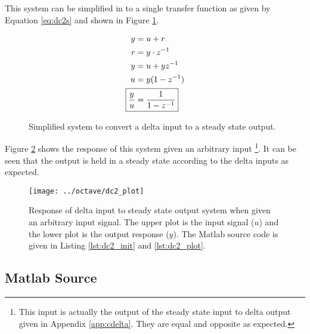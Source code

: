 \documentclass{article}
\begin{document}
This system can be simplified in to a single transfer function
as given by Equation \ref{eq:dc2s} and shown in Figure \ref{fig:dc1s}.

\begin{align}
	y &= u + r \notag \\
	r &= y \cdot z^{-1} \notag \\
	y &= u + y z^{-1} \notag \\
	u &= y(1 - z^{-1}) \notag \\
	\Aboxed{ \frac{y}{u} &= \frac{1}{1 - z^{-1}} } \label{eq:dc2s}
\end{align}

\begin{figure}[!htbp]
\begin{center}


\end{center}
\caption{Simplified system to convert a delta input to
a steady state output.}
\label{fig:dc1s}
\end{figure}

Figure \ref{fig:dc2_plot} shows the response of this system given
an arbitrary input
\footnote{This input is actually the output of the steady state input
to delta output given in Appendix \ref{app:cdelta}.
They are equal and opposite as expected.}.
It can be seen that the output is held in a steady state according
to the delta inputs as expected.

\begin{figure}[htbp!]
\texttt{[image: ../octave/dc2\_plot]}
\caption{Response of delta input to steady state output system
when given an arbitrary input signal.
The upper plot is the input signal ($u$) and the lower plot is
the output response ($y$).
The Matlab source code is given in Listing \ref{lst:dc2_init}
and \ref{lst:dc2_plot}.
}
\label{fig:dc2_plot}
\end{figure}

\clearpage
\subsection{Matlab Source}
\label{app:dcsrc}
\end{document}
